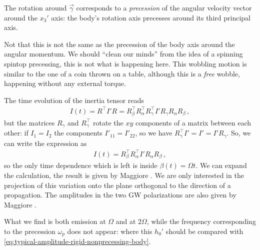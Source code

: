 \documentclass[main.tex]{subfiles}
\begin{document}
The rotation around \(\vec{\gamma}\) corresponds to a \emph{precession} of the angular velocity vector around the \(x_3'\) axis: the body's rotation axis precesses around its third principal axis.

Not that this is not the same as the precession of the body axis around the angular momentum. 
We should ``clean our minds'' from the idea of a spinning spintop precessing, this is not what is happening here.
This wobbling motion is similar to the one of a coin thrown on a table, although this is a \emph{free} wobble, happening without any external torque. 


The time evolution of the inertia tensor reads 
%
\begin{align}
I (t) = R^{\top} I' R = 
R_{\beta }^{\top} R_{\alpha }^{\top} R_{\gamma }^{\top} I' 
R_{\gamma } R_{\alpha } R_{\beta }
\,,
\end{align}
%
but the matrices \(R_{\gamma }\) and \(R_{\gamma }^{\top}\) rotate the \(xy\) components of a matrix between each other: if \(I_1 = I_2 \) the components \(I'_{11} = I'_{22}\), so we have \(R_{\gamma }^{\top} I' = I' = I' R_{\gamma }\). So, we can write the expression as 
%
\begin{align}
I (t) = 
R_{\beta }^{\top} R_{\alpha }^{\top}  I' 
R_{\alpha } R_{\beta }
\,,
\end{align}
%
so the only time dependence which is left is inside \(\beta (t) = \Omega t\). 
We can expand the calculation, the result is given by Maggiore \cite[eq.\ 4.245]{maggioreGravitationalWavesVolume2007}. 
We are only interested in the projection of this variation onto the plane orthogonal to the direction of a propagation. 
The amplitudes in the two GW polarizations are also given by Maggiore \cite[eq.\ 4.246 -- 252]{maggioreGravitationalWavesVolume2007}.


What we find is both emission at \(\Omega \) and at \(2 \Omega \), while the frequency corresponding to the precession \(\omega_{p}\) does not appear: 
%
%
where this \(h_0'\) should be compared with \eqref{eq:typical-amplitude-rigid-nonprecessing-body}. 
\end{document}
